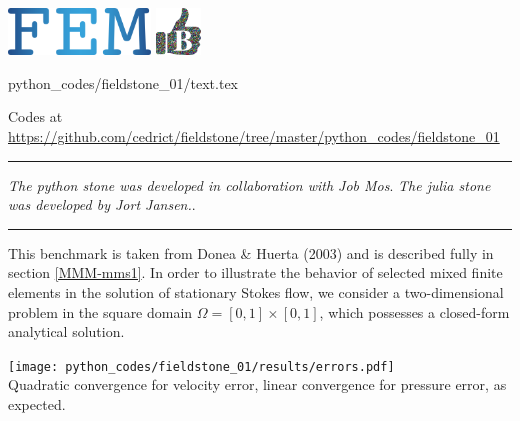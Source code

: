 \includegraphics[height=1.25cm]{images/pictograms/FEM}
\includegraphics[height=1.25cm]{images/pictograms/benchmark}

\begin{flushright} {\tiny {\color{gray} python\_codes/fieldstone\_01/text.tex}} \end{flushright}



\begin{center}

Codes at \url{https://github.com/cedrict/fieldstone/tree/master/python_codes/fieldstone_01}
\end{center}

\par\noindent\rule{\textwidth}{0.4pt}

{\sl The python stone was developed in collaboration with Job Mos}. 
{\sl The julia stone was developed by Jort Jansen.}. 

\par\noindent\rule{\textwidth}{0.4pt}

This benchmark is taken from Donea \& Huerta (2003) \cite{dohu03} and is described fully in section \ref{MMM-mms1}. 
In order to illustrate the behavior of selected mixed finite elements in the solution 
of stationary Stokes flow,  we consider a two-dimensional problem 
in the square domain $\Omega=[0,1]\times[0,1]$, which possesses a closed-form analytical 
solution. 

\begin{center}
\texttt{[image: python\_codes/fieldstone\_01/results/errors.pdf]}\\
{\captionfont Quadratic convergence for velocity error, 
linear convergence for pressure error, as expected.}
\end{center}

